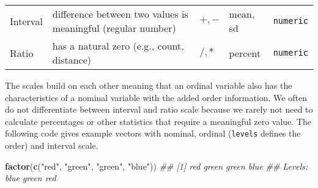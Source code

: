 \documentclass[
  notitlepage]{book}
\newenvironment{Shaded}{\begin{snugshade}}{\end{snugshade}}
\newcommand{\CommentTok}[1]{\textcolor[rgb]{0.56,0.35,0.01}{\textit{#1}}}
\newcommand{\KeywordTok}[1]{\textcolor[rgb]{0.13,0.29,0.53}{\textbf{#1}}}
\newcommand{\NormalTok}[1]{#1}
\newcommand{\StringTok}[1]{\textcolor[rgb]{0.31,0.60,0.02}{#1}}
\begin{document}
\begin{longtable}[]{@{}lllll@{}}
\begin{minipage}[t]{0.19\columnwidth}\raggedright
Interval\strut
\end{minipage} & \begin{minipage}[t]{0.23\columnwidth}\raggedright
difference between two values is meaningful (regular number)\strut
\end{minipage} & \begin{minipage}[t]{0.17\columnwidth}\raggedright
\(+, -\)\strut
\end{minipage} & \begin{minipage}[t]{0.13\columnwidth}\raggedright
mean, sd\strut
\end{minipage} & \begin{minipage}[t]{0.13\columnwidth}\raggedright
\texttt{numeric}\strut
\end{minipage}\tabularnewline
\begin{minipage}[t]{0.19\columnwidth}\raggedright
Ratio\strut
\end{minipage} & \begin{minipage}[t]{0.23\columnwidth}\raggedright
has a natural zero (e.g., count, distance)\strut
\end{minipage} & \begin{minipage}[t]{0.17\columnwidth}\raggedright
\(/, *\)\strut
\end{minipage} & \begin{minipage}[t]{0.13\columnwidth}\raggedright
percent\strut
\end{minipage} & \begin{minipage}[t]{0.13\columnwidth}\raggedright
\texttt{numeric}\strut
\end{minipage}\tabularnewline
\bottomrule
\end{longtable}

The scales build on each other meaning that an ordinal variable also has the characteristics of
a nominal variable with the added order information.
We often do not differentiate between interval and ratio scale because we rarely
not need to calculate percentages or other statistics that require a meaningful zero value.
The following code gives example vectors with nominal, ordinal (\texttt{levels} defines the order)
and interval scale.

\begin{Shaded}
\begin{Highlighting}[]
\KeywordTok{factor}\NormalTok{(}\KeywordTok{c}\NormalTok{(}\StringTok{"red"}\NormalTok{, }\StringTok{"green"}\NormalTok{, }\StringTok{"green"}\NormalTok{, }\StringTok{"blue"}\NormalTok{))}
\CommentTok{\#\# [1] red   green green blue }
\CommentTok{\#\# Levels: blue green red}
\end{Highlighting}
\end{Shaded}
\end{document}
